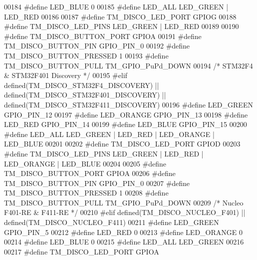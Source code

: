\begin{DoxyCode}
00184 \textcolor{preprocessor}{    #define LED\_BLUE                    0}
00185 \textcolor{preprocessor}{    #define LED\_ALL                     LED\_GREEN | LED\_RED}
00186     
00187 \textcolor{preprocessor}{    #define TM\_DISCO\_LED\_PORT           GPIOG}
00188 \textcolor{preprocessor}{    #define TM\_DISCO\_LED\_PINS           LED\_GREEN | LED\_RED}
00189 
00190 \textcolor{preprocessor}{    #define TM\_DISCO\_BUTTON\_PORT        GPIOA}
00191 \textcolor{preprocessor}{    #define TM\_DISCO\_BUTTON\_PIN         GPIO\_PIN\_0}
00192 \textcolor{preprocessor}{    #define TM\_DISCO\_BUTTON\_PRESSED     1}
00193 \textcolor{preprocessor}{    #define TM\_DISCO\_BUTTON\_PULL        TM\_GPIO\_PuPd\_DOWN}
00194 \textcolor{comment}{/* STM32F4 & STM32F401 Discovery */}
00195 \textcolor{preprocessor}{#elif defined(TM\_DISCO\_STM32F4\_DISCOVERY) || defined(TM\_DISCO\_STM32F401\_DISCOVERY) ||
       defined(TM\_DISCO\_STM32F411\_DISCOVERY)}
00196 \textcolor{preprocessor}{    #define LED\_GREEN                   GPIO\_PIN\_12}
00197 \textcolor{preprocessor}{    #define LED\_ORANGE                  GPIO\_PIN\_13}
00198 \textcolor{preprocessor}{    #define LED\_RED                     GPIO\_PIN\_14}
00199 \textcolor{preprocessor}{    #define LED\_BLUE                    GPIO\_PIN\_15}
00200 \textcolor{preprocessor}{    #define LED\_ALL                     LED\_GREEN | LED\_RED | LED\_ORANGE | LED\_BLUE}
00201     
00202 \textcolor{preprocessor}{    #define TM\_DISCO\_LED\_PORT           GPIOD}
00203 \textcolor{preprocessor}{    #define TM\_DISCO\_LED\_PINS           LED\_GREEN | LED\_RED | LED\_ORANGE | LED\_BLUE}
00204 
00205 \textcolor{preprocessor}{    #define TM\_DISCO\_BUTTON\_PORT        GPIOA}
00206 \textcolor{preprocessor}{    #define TM\_DISCO\_BUTTON\_PIN         GPIO\_PIN\_0}
00207 \textcolor{preprocessor}{    #define TM\_DISCO\_BUTTON\_PRESSED     1}
00208 \textcolor{preprocessor}{    #define TM\_DISCO\_BUTTON\_PULL        TM\_GPIO\_PuPd\_DOWN}
00209 \textcolor{comment}{/* Nucleo F401-RE & F411-RE */}
00210 \textcolor{preprocessor}{#elif defined(TM\_DISCO\_NUCLEO\_F401) || defined(TM\_DISCO\_NUCLEO\_F411)}
00211 \textcolor{preprocessor}{    #define LED\_GREEN                   GPIO\_PIN\_5}
00212 \textcolor{preprocessor}{    #define LED\_RED                     0}
00213 \textcolor{preprocessor}{    #define LED\_ORANGE                  0}
00214 \textcolor{preprocessor}{    #define LED\_BLUE                    0}
00215 \textcolor{preprocessor}{    #define LED\_ALL                     LED\_GREEN}
00216     
00217 \textcolor{preprocessor}{    #define TM\_DISCO\_LED\_PORT           GPIOA}

\end{DoxyCode}
